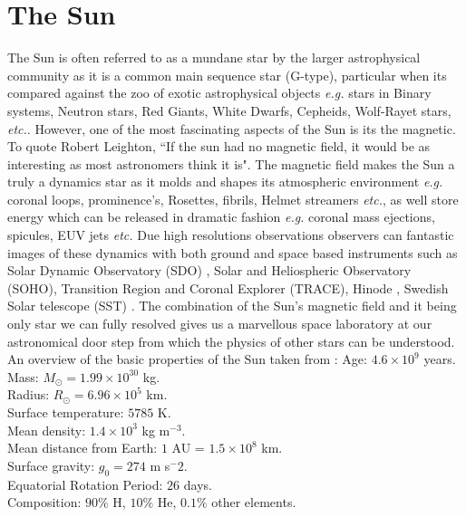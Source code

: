 \documentclass[12pt]{ociamthesis}
\newcommand{\np}{\\ \\}
\begin{document}
\section{The Sun}
\label{sec:Sun}
The Sun is often referred to as a mundane star by the larger astrophysical community as it is a common main sequence star (G-type), particular when its compared against the zoo of exotic astrophysical objects \textit{e.g.} stars in Binary systems, Neutron stars, Red Giants, White Dwarfs, Cepheids, Wolf-Rayet stars, \textit{etc.}. However, one of the most fascinating aspects of the Sun is its the magnetic. To quote Robert Leighton, ``If the sun had no magnetic field, it would be as interesting as most astronomers think it is". The magnetic field makes the Sun a truly a dynamics star as it molds and shapes its atmospheric environment \textit{e.g.} coronal loops, prominence's, Rosettes, fibrils, Helmet streamers \textit{etc.}, as well store energy which can be released in dramatic fashion \textit{e.g.} coronal mass ejections, spicules, EUV jets \textit{etc.} Due high resolutions observations observers can fantastic images of these dynamics with both ground and space based instruments such as Solar Dynamic Observatory (SDO) \citep{Lemen2012SoPh27517L}, Solar and Heliospheric Observatory (SOHO), Transition Region and Coronal Explorer (TRACE), Hinode \citep{Tsuneta2008SoPh,Suematsu2008SoPh,Ichimoto2008SoPh}, Swedish Solar telescope (SST) \citep{Scharmer2003SPIE}. The combination of the Sun's magnetic field and it being only star we can fully resolved gives us a marvellous space laboratory at our astronomical door step from which the physics of other stars can be understood. An overview of the basic properties of the Sun taken from \cite{priest2014magnetohydrodynamics}:
Age: $4.6 \times 10^9$ years. \\
Mass: $M_{\odot}= 1.99 \times 10^{30}$ kg. \\
Radius: $R_{\odot} = 6.96 \times 10^5$ km. \\
Surface temperature: $5785$ K. \\
Mean density: $1.4 \times 10^3$ kg m$^{-3}$. \\
Mean distance from Earth: $1$ AU = $1.5 \times 10^8$ km. \\
Surface gravity: $g_{0}=274$ m s$^-2$. \\
Equatorial Rotation Period: $26$ days. \\
Composition: $90 \%$ H, $10 \%$ He, $0.1 \%$ other elements.     \np
\end{document}
